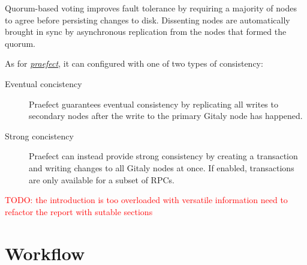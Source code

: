 \documentclass[acmlarge, screen, nonacm]{acmart}
\newcommand{\todo}[1]{\textcolor{red}{TODO: #1}}
\begin{document}
  Quorum-based voting improves fault tolerance by requiring a majority of nodes 
  to agree before persisting changes to disk. Dissenting nodes are automatically brought in sync by
   asynchronous replication from the nodes that formed the quorum.

  As for \emph{\href{https://gitlab.com/groups/gitlab-org/-/epics/1189}{praefect}}, it can configured with one of two types of consistency:
  \begin{description}
    \item[Eventual concistency]
    Praefect guarantees eventual consistency by replicating all writes 
    to secondary nodes after the write to the primary Gitaly node has happened.
    \item[Strong concistency]
    Praefect can instead provide strong consistency by creating a transaction and writing
     changes to all Gitaly nodes at once. If enabled, transactions are only available for a subset of RPCs. 
  \end{description}

  \todo{the introduction is too overloaded with versatile information need to refactor the report with sutable sections}

\section{Workflow}
\end{document}
